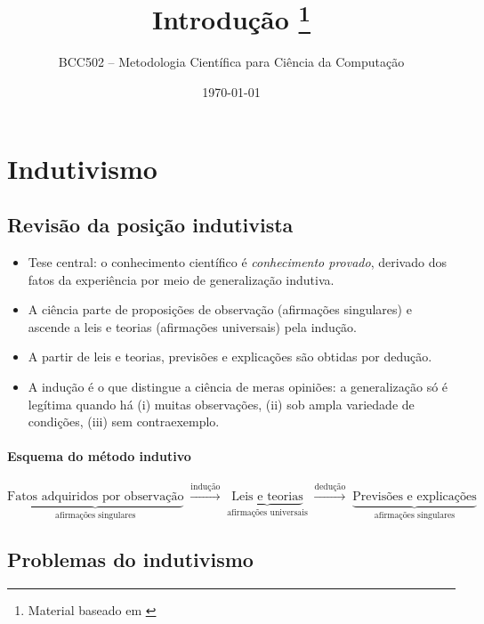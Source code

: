 \documentclass[9pt,a4paper]{extarticle}
\newcommand{\impt}[1]{\textcolor{important}{#1}}
\newcommand{\ntc}[1]{\textcolor{notice}{#1}}
\begin{document}
\title{Introdução \footnote{Material baseado em \citep{chalmers1993ciencia}}}
\author{BCC502 -- Metodologia Científica para Ciência da Computação}
\date{\today}
\maketitle

\tableofcontents

\section{Indutivismo}

\subsection{Revisão da posição indutivista}

\begin{itemize}
    \item \ntc{Tese central}: o conhecimento científico é \emph{conhecimento provado}, derivado dos fatos da experiência por meio de \impt{generalização indutiva}.
    \item A ciência parte de proposições de observação (afirmações singulares) e ascende a leis e teorias (afirmações universais) pela indução.
    \item A partir de leis e teorias, previsões e explicações são obtidas por \ntc{dedução}.
    \item A indução é o que distingue a ciência de meras opiniões: a generalização só é legítima quando há (i) muitas observações, (ii) sob ampla variedade de condições, (iii) sem contraexemplo.
\end{itemize}

\paragraph{Esquema do método indutivo}

\[
\underbrace{\text{Fatos adquiridos por observação}}_{\text{afirmações singulares}}
\;\xrightarrow{\text{indução}}\;
\underbrace{\text{Leis e teorias}}_{\text{afirmações universais}}
\;\xrightarrow{\text{dedução}}\;
\underbrace{\text{Previsões e explicações}}_{\text{afirmações singulares}}
\]

\subsection{Problemas do indutivismo}
\end{document}
